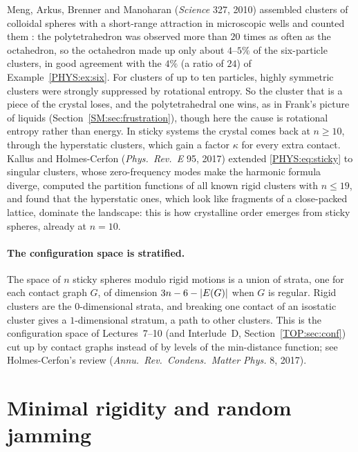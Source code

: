 Meng, Arkus, Brenner and Manoharan (\emph{Science} 327, 2010) assembled clusters of colloidal spheres with a
short-range attraction in microscopic wells and counted them : the polytetrahedron
was observed more than $20$ times as often as the octahedron, so the octahedron made up only about
$4$--$5\%$ of the six-particle clusters, in good agreement with the $4\%$ (a ratio of $24$) of
Example~\ref{PHYS:ex:six}. For clusters of up to ten particles, highly symmetric clusters were strongly
suppressed by rotational entropy. So the cluster that is a piece of
the crystal loses, and the polytetrahedral one wins, as in Frank's picture of liquids (Section~\ref{SM:sec:frustration}),
though here the cause is rotational entropy rather than energy. In sticky systems the crystal comes back at
$n\ge10$, through the hyperstatic clusters, which gain a factor $\kappa$ for every extra contact. Kallus
and Holmes-Cerfon (\emph{Phys.\ Rev.~E} 95, 2017) extended \eqref{PHYS:eq:sticky} to singular clusters,
whose zero-frequency modes make the harmonic formula diverge, computed the partition functions of all
known rigid clusters with $n\le19$, and found that the hyperstatic ones, which look like fragments of a
close-packed lattice, dominate the landscape: this is how crystalline order emerges from sticky spheres,
already at $n=10$.

\paragraph{The configuration space is stratified.} The space of $n$ sticky spheres modulo rigid motions is
a union of strata, one for each contact graph $G$, of dimension $3n-6-\left\lvert E(G) \right\rvert$ when $G$ is regular. Rigid
clusters are the $0$-dimensional strata, and breaking one contact of an isostatic cluster gives a
$1$-dimensional stratum, a path to other clusters. This is the configuration space of Lectures~7--10 (and
Interlude~D, Section~\ref{TOP:sec:conf}) cut up by contact graphs instead of by levels of the min-distance
function; see Holmes-Cerfon's review (\emph{Annu.\ Rev.\ Condens.\ Matter Phys.} 8, 2017).

\section{Minimal rigidity and random jamming}
\label{PHYS:sec:jam}

